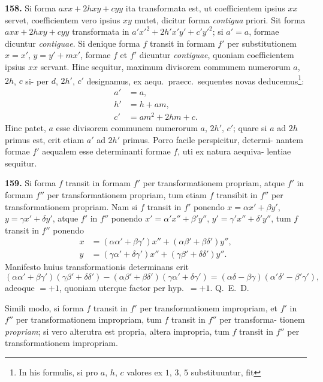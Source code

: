 \documentclass[12pt,a4paper]{article}
\begin{document}
\textbf{158.}
Si forma $axx + 2hxy + cyy$ ita transformata est, ut coefficientem
ipsius $xx$ servet, coefficientem vero ipsius $xy$ mutet, dicitur forma \textit{contigua} priori.
Sit forma $axx + 2hxy + cyy$ transformata in $a'x'^2 + 2h'x'y' + c'y'^2$; si
$a' = a$, formae dicuntur \textit{contiguae}. Si denique forma $f$ transit in formam $f'$
per substitutionem $x = x'$, $y = y' + mx'$, formae $f$ et $f'$ dicuntur \textit{contiguae},
quoniam coefficientem ipsius $xx$ servant. Hinc sequitur, maximum divisorem communem numerorum $a$, $2h$, $c$ si-
per $d$, $2h'$, $c'$ designamus, ex aequ.\ praecc.\ sequentes novas deducemus\footnote{In his formulis, si pro $a$, $h$, $c$ valores ex $1$, $3$, $5$ substituuntur, fit}:
\begin{align*}
a' &= a, \\
h' &= h + am, \\
c' &= am^2 + 2hm + c.
\end{align*}
Hinc patet, $a$ esse divisorem communem numerorum $a$, $2h'$, $c'$; quare si $a$ ad
$2h$ primus est, erit etiam $a'$ ad $2h'$ primus. Porro facile perspicitur, determi-
nantem formae $f'$ aequalem esse determinanti formae $f$, uti ex natura aequiva-
lentiae sequitur.

\textbf{159.}
Si forma $f$ transit in formam $f'$ per transformationem propriam, atque
$f'$ in formam $f''$ per transformationem propriam, tum etiam $f$ transibit in $f''$
per transformationem propriam. Nam si $f$ transit in $f'$ ponendo
$x = \alpha x' + \beta y'$, $y = \gamma x' + \delta y'$, atque $f'$ in $f''$ ponendo
$x' = \alpha' x'' + \beta' y''$, $y' = \gamma' x'' + \delta' y''$,
tum $f$ transit in $f''$ ponendo
\begin{align*}
x &= (\alpha\alpha' + \beta\gamma')x'' + (\alpha\beta' + \beta\delta')y'', \\
y &= (\gamma\alpha' + \delta\gamma')x'' + (\gamma\beta' + \delta\delta')y''.
\end{align*}
Manifesto huius transformationis determinans erit
\[
(\alpha\alpha' + \beta\gamma')(\gamma\beta' + \delta\delta') - (\alpha\beta' + \beta\delta')(\gamma\alpha' + \delta\gamma')
= (\alpha\delta - \beta\gamma)(\alpha'\delta' - \beta'\gamma'),
\]
adeoque $= +1$, quoniam uterque factor per hyp.\ $= +1$. Q.~E.~D.

Simili modo, si forma $f$ transit in $f'$ per transformationem impropriam, et
$f'$ in $f''$ per transformationem impropriam, tum $f$ transit in $f''$ per transforma-
tionem \textit{propriam}; si vero alterutra est propria, altera impropria, tum $f$ transit
in $f''$ per transformationem impropriam.
\end{document}
